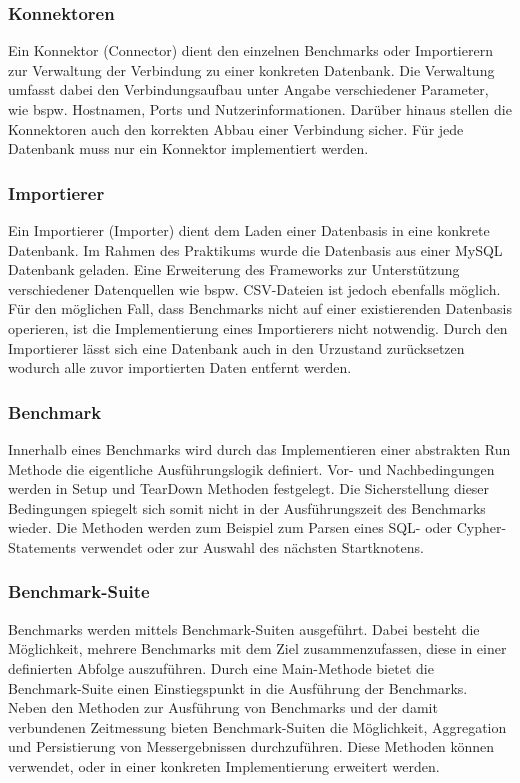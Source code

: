 \documentclass[11pt, a4paper, oneside]{article} %
\begin{document}
\subsubsection{Konnektoren}
Ein Konnektor (Connector) dient den einzelnen Benchmarks oder Importierern zur Verwaltung der  Verbindung zu einer konkreten Datenbank. Die Verwaltung umfasst dabei den Verbindungsaufbau unter Angabe verschiedener Parameter, wie bspw. Hostnamen, Ports und Nutzerinformationen. Darüber hinaus stellen die Konnektoren auch den korrekten Abbau einer Verbindung sicher. Für jede Datenbank muss nur ein Konnektor implementiert werden.

\subsubsection{Importierer}
Ein Importierer (Importer) dient dem Laden einer Datenbasis in eine konkrete Datenbank. Im Rahmen des Praktikums wurde die Datenbasis aus einer MySQL Datenbank geladen. Eine Erweiterung des Frameworks zur Unterstützung verschiedener Datenquellen wie bspw. CSV-Dateien ist jedoch ebenfalls möglich. Für den möglichen Fall, dass Benchmarks nicht auf einer existierenden Datenbasis operieren, ist die Implementierung eines Importierers nicht notwendig. Durch den Importierer lässt sich eine Datenbank auch in den Urzustand zurücksetzen wodurch alle zuvor importierten Daten entfernt werden.

\subsubsection{Benchmark}
Innerhalb eines Benchmarks wird durch das Implementieren einer abstrakten Run Methode die eigentliche Ausführungslogik definiert. Vor- und Nachbedingungen werden in Setup und TearDown Methoden festgelegt. Die Sicherstellung dieser Bedingungen spiegelt sich somit nicht in der Ausführungszeit des Benchmarks wieder. Die Methoden werden zum Beispiel zum Parsen eines SQL- oder Cypher-Statements verwendet oder zur Auswahl des nächsten Startknotens.

\subsubsection{Benchmark-Suite}
Benchmarks werden mittels Benchmark-Suiten ausgeführt. Dabei besteht die Möglichkeit, mehrere Benchmarks mit dem Ziel zusammenzufassen, diese in einer definierten Abfolge auszuführen. Durch eine Main-Methode bietet die Benchmark-Suite einen Einstiegspunkt in die Ausführung der Benchmarks.\\
Neben den Methoden zur Ausführung von Benchmarks und der damit verbundenen Zeitmessung bieten Benchmark-Suiten die Möglichkeit, Aggregation und Persistierung von Messergebnissen durchzuführen. Diese Methoden können verwendet, oder in einer konkreten Implementierung erweitert werden.
\end{document}
